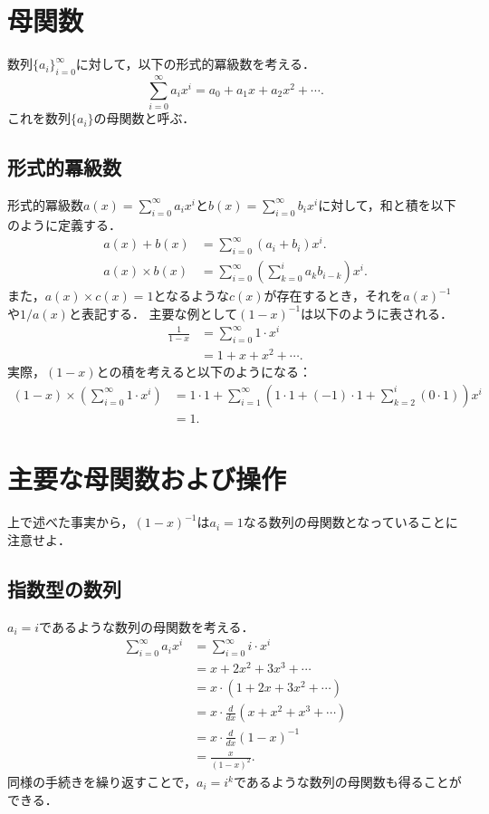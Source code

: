 \documentclass{jsarticle}
\begin{document}
\section{母関数}

数列$\{a_i\}_{i=0}^{\infty}$に対して，以下の形式的冪級数を考える．
\[\sum_{i=0}^{\infty} a_i x^i = a_0 + a_1 x + a_2 x^2 + \cdots.\]
これを数列$\{a_i\}$の母関数と呼ぶ．

\subsection{形式的冪級数}


形式的冪級数$a(x) = \sum_{i=0}^{\infty} a_i x^i$と$b(x) = \sum_{i=0}^{\infty} b_i x^i$に対して，和と積を以下のように定義する．
\begin{align*}
a(x) + b(x) &= \sum_{i=0}^{\infty} (a_i+b_i) x^i.\\
a(x) \times b(x) &= \sum_{i=0}^{\infty} \left(\sum_{k=0}^i a_k b_{i-k}\right) x^i.
\end{align*}
また，$a(x) \times c(x) = 1$となるような$c(x)$が存在するとき，それを$a(x)^{-1}$や$1/a(x)$と表記する．
主要な例として$(1-x)^{-1}$は以下のように表される．
\begin{align*}
  \frac{1}{1-x} &= \sum_{i=0}^\infty 1\cdot x^i\\
  &= 1 + x + x^2 + \cdots.
\end{align*}
実際，$(1-x)$との積を考えると以下のようになる：
\begin{align*}
  (1-x) \times \left(\sum_{i=0}^\infty 1\cdot x^i\right)
  &= 1\cdot 1 + \sum_{i=1}^\infty\left(1\cdot 1 + (-1)\cdot 1 + \sum_{k=2}^i (0\cdot 1)\right)x^i\\
  &= 1.
\end{align*}

\section{主要な母関数および操作}

上で述べた事実から，$(1-x)^{-1}$は$a_i = 1$なる数列の母関数となっていることに注意せよ．

\subsection{指数型の数列}
$a_i = i$であるような数列の母関数を考える．
\begin{align*}
  \sum_{i=0}^\infty a_i x^i &= \sum_{i=0}^\infty i\cdot x^i\\
  &= x + 2x^2 + 3x^3 + \cdots\\
  &= x \cdot (1 + 2x + 3x^2 + \cdots)\\
  &= x \cdot \frac{d}{dx}(x + x^2 + x^3 + \cdots)\\
  &= x \cdot \frac{d}{dx} (1-x)^{-1}\\
  &= \frac{x}{(1-x)^2}.
\end{align*}
同様の手続きを繰り返すことで，$a_i = i^k$であるような数列の母関数も得ることができる．
\end{document}
